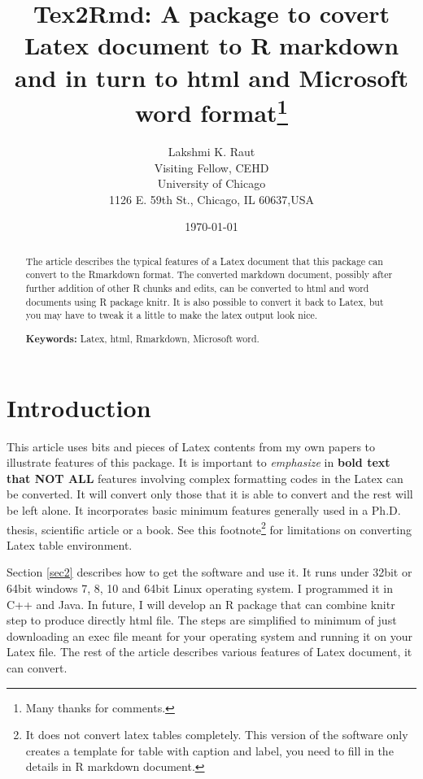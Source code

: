 \documentclass[12pt,svgnames]{article}
\begin{document}
\title{Tex2Rmd: A package to covert Latex document to R markdown and in turn to html and Microsoft word format\thanks{%
Many thanks for comments.
}}
\author{Lakshmi K. Raut \\
Visiting Fellow, CEHD\\
University of Chicago\\
1126 E. 59th St., Chicago, IL 60637,USA
}
\date{\today}
\maketitle 
\begin{abstract}
The article describes the typical features of a Latex document that this package can convert to the Rmarkdown format. The converted markdown document, possibly after further addition of other R chunks and edits, can be converted to html and word documents using R package knitr. It is also possible to convert it back to Latex, but you may have to tweak it a little to make the latex output look nice. 

\textbf{Keywords:} Latex, html, Rmarkdown, Microsoft word. 
\end{abstract}

\section{Introduction}\label{sec1}
This article uses bits and pieces of Latex contents from my own papers to illustrate features of this package. It is important to \emph{emphasize} in \textbf{bold text that NOT ALL} features involving complex formatting codes in the Latex can be converted. It will convert only those that it is able to convert and the rest will be left alone. It incorporates basic minimum features generally used in a Ph.D. thesis, scientific article or a book. See this footnote\footnote{%
It does not convert latex tables completely. This version of the software only creates a template for table with caption and label, you need to fill in the details in R markdown document.} for limitations on converting Latex table environment.

Section \ref{sec2} describes how to get the software and use it. It runs under 32bit or 64bit windows 7, 8, 10 and 64bit Linux operating system. I programmed it in C++ and Java. In future, I will develop an R package that can combine knitr step to produce directly html file.  The steps are simplified to minimum of just downloading an exec file meant for your operating system and running it on your Latex file. The rest of the article describes various features of Latex document, it can convert. 
 
\end{document}
